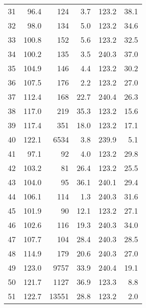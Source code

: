\begin{tabular}{|r|r|r|r|r|r|}
31 &  96.4 & 124 & 3.7 & 123.2 & 38.1\\
32 &  98.0 & 134 & 5.0 & 123.2 & 34.6\\
33 &  100.8 & 152 & 5.6 & 123.2 & 32.5\\
34 &  100.2 & 135 & 3.5 & 240.3 & 37.0\\
35 &  104.9 & 146 & 4.4 & 123.2 & 30.2\\
36 &  107.5 & 176 & 2.2 & 123.2 & 27.0\\
37 &  112.4 & 168 & 22.7 & 240.4 & 26.3\\
38 &  117.0 & 219 & 35.3 & 123.2 & 15.6\\
39 &  117.4 & 351 & 18.0 & 123.2 & 17.1\\
40 &  122.1 & 6534 & 3.8 & 239.9 & 5.1\\
41 &  97.1 & 92 & 4.0 & 123.2 & 29.8\\
42 &  103.2 & 81 & 26.4 & 123.2 & 25.5\\
43 &  104.0 & 95 & 36.1 & 240.1 & 29.4\\
44 &  106.1 & 114 & 1.3 & 240.3 & 31.6\\
45 &  101.9 & 90 & 12.1 & 123.2 & 27.1\\
46 &  102.6 & 116 & 19.3 & 240.3 & 34.0\\
47 &  107.7 & 104 & 28.4 & 240.3 & 28.5\\
48 &  114.9 & 179 & 20.6 & 240.3 & 27.0\\
49 &  123.0 & 9757 & 33.9 & 240.4 & 19.1\\
50 &  121.7 & 1127 & 36.9 & 123.3 & 8.8\\
51 &  122.7 & 13551 & 28.8 & 123.2 & 2.0\\
\hline
\end{tabular}

